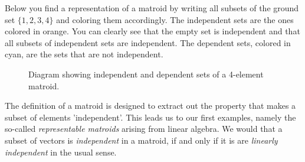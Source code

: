 Below you find a representation of a matroid by writing all subsets of the ground set $\{1,2,3,4\}$ and coloring them accordingly. The independent sets are the ones colored in orange. You can clearly see that the empty set is independent and that all subsets of independent sets are independent. The dependent sets, colored in cyan, are the sets that are not independent.


\begin{figure}[h]
\begin{center}
\end{center}
\caption{Diagram showing independent and dependent sets of a 4-element matroid.}
\end{figure}


The definition of a matroid is designed to extract out the property that makes a subset of elements 'independent'. This leads us to our first examples, namely the so-called \textit{representable matroids} arising from linear algebra. We would that a subset of vectors is \textit{independent} in a matroid, if and only if it is are \textit{linearly independent} in the usual sense. 



